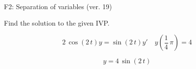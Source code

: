 \begin{exercise}
  \begin{exerciseTitle}F2: Separation of variables (ver. 19)\end{exerciseTitle}
  \begin{exerciseStatement}
    
Find the solution to the given IVP.

    
\[2 \, \cos\left(2 \, t\right) y= \sin\left(2 \, t\right) y'\hspace{1em} y\left( \frac{1}{4} \, \pi \right)= 4\]

  \end{exerciseStatement}
  \begin{exerciseAnswer}
    
\[y= 4 \, \sin\left(2 \, t\right)\]

  \end{exerciseAnswer}
\end{exercise}
